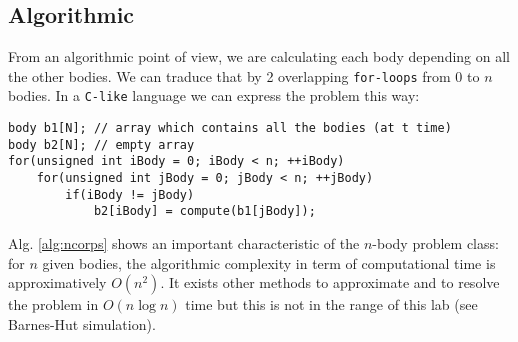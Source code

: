 \subsection{Algorithmic}
From an algorithmic point of view, we are calculating each body depending on all the other bodies.
We can traduce that by 2 overlapping \texttt{for-loops} from $0$ to $n$ bodies. 
In a \texttt{C-like} language we can express the problem this way:
\begin{lstlisting}[caption={$n$-body pseudo-code algorithm},label={alg:ncorps}]
body b1[N]; // array which contains all the bodies (at t time)
body b2[N]; // empty array
for(unsigned int iBody = 0; iBody < n; ++iBody)
	for(unsigned int jBody = 0; jBody < n; ++jBody)
		if(iBody != jBody)
			b2[iBody] = compute(b1[jBody]);
\end{lstlisting}
Alg. \ref{alg:ncorps} shows an important characteristic of the $n$-body problem class: for $n$ given bodies, the algorithmic complexity in term of computational time is approximatively $O(n^2)$.
It exists other methods to approximate and to resolve the problem in $O(n \log{n} )$ time but this is not in the range of this lab (see {\sc Barnes-Hut} simulation).
